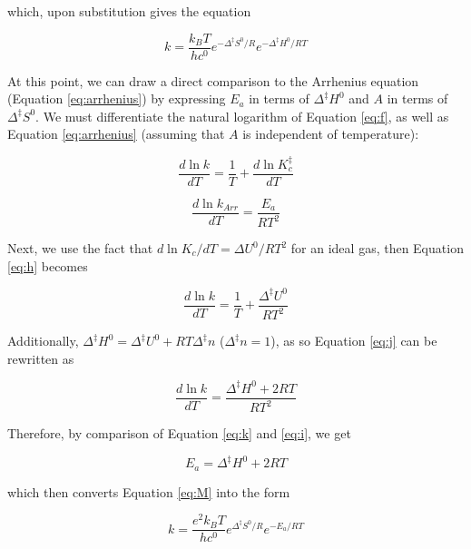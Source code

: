 \noindent which, upon substitution gives the equation

\begin{equation}
  k = \frac{k_BT}{hc^0} e^{-\Delta^\ddagger S^0/R} e^{-\Delta^\ddagger H^0/RT}
\label{eq:M}
\end{equation}

At this point, we can draw a direct comparison to the Arrhenius equation (Equation \ref{eq:arrhenius}) by expressing $E_a$ in terms of $\Delta^\ddagger H^0$ and $A$ in terms of $\Delta^\ddagger S^0$.  We must differentiate the natural logarithm of Equation \ref{eq:f}, as well as Equation \ref{eq:arrhenius} (assuming that $A$ is independent of temperature):

\begin{equation}
  \frac{d \ln k}{dT} = \frac{1}{T} + \frac{d \ln K_c^\ddagger}{dT}
  \label{eq:h}
\end{equation}

\begin{equation}
  \frac{d \ln k_{Arr}}{dT} = \frac{E_a}{RT^2}
  \label{eq:i}
\end{equation}

\noindent Next, we use the fact that $d \ln K_c / dT = \Delta U^0/RT^2$ for an ideal gas, then Equation \ref{eq:h}  becomes

\begin{equation}
  \frac{d \ln k}{dT} = \frac{1}{T} + \frac{\Delta ^\ddagger U^0}{RT^2}
  \label{eq:j}
\end{equation}

\noindent Additionally, $\Delta ^\ddagger H^0 = \Delta ^\ddagger U^0 + RT \Delta^\ddagger n$ ($\Delta^\ddagger n = 1$), as so Equation \ref{eq:j} can be rewritten as

\begin{equation}
  \frac{d \ln k}{dT} = \frac{\Delta ^\ddagger H^0 + 2RT}{RT^2}
  \label{eq:k}
\end{equation}

\noindent Therefore, by comparison of Equation \ref{eq:k} and \ref{eq:i}, we get

\begin{equation}
  E_a = \Delta^\ddagger H^0 + 2RT
\end{equation}

\noindent which then converts Equation \ref{eq:M} into the form

\begin{equation}
  k = \frac{e^2k_BT}{hc^0}e^{\Delta^\ddagger S^0/R}e^{-E_a/RT}
\end{equation}

